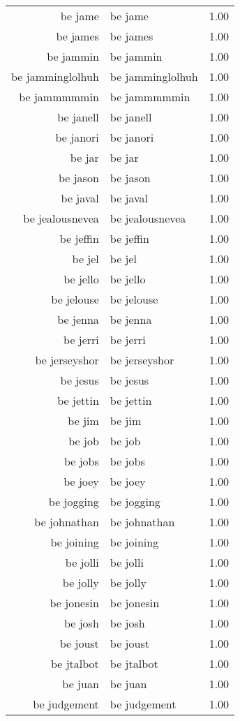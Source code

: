 \begin{table}[ht]
\begin{tabular}{rlr}
  be jame & be jame & 1.00 \\ 
  be james & be james & 1.00 \\ 
  be jammin & be jammin & 1.00 \\ 
  be jamminglolhuh & be jamminglolhuh & 1.00 \\ 
  be jammmmmin & be jammmmmin & 1.00 \\ 
  be janell & be janell & 1.00 \\ 
  be janori & be janori & 1.00 \\ 
  be jar & be jar & 1.00 \\ 
  be jason & be jason & 1.00 \\ 
  be javal & be javal & 1.00 \\ 
  be jealousnevea & be jealousnevea & 1.00 \\ 
  be jeffin & be jeffin & 1.00 \\ 
  be jel & be jel & 1.00 \\ 
  be jello & be jello & 1.00 \\ 
  be jelouse & be jelouse & 1.00 \\ 
  be jenna & be jenna & 1.00 \\ 
  be jerri & be jerri & 1.00 \\ 
  be jerseyshor & be jerseyshor & 1.00 \\ 
  be jesus & be jesus & 1.00 \\ 
  be jettin & be jettin & 1.00 \\ 
  be jim & be jim & 1.00 \\ 
  be job & be job & 1.00 \\ 
  be jobs & be jobs & 1.00 \\ 
  be joey & be joey & 1.00 \\ 
  be jogging & be jogging & 1.00 \\ 
  be johnathan & be johnathan & 1.00 \\ 
  be joining & be joining & 1.00 \\ 
  be jolli & be jolli & 1.00 \\ 
  be jolly & be jolly & 1.00 \\ 
  be jonesin & be jonesin & 1.00 \\ 
  be josh & be josh & 1.00 \\ 
  be joust & be joust & 1.00 \\ 
  be jtalbot & be jtalbot & 1.00 \\ 
  be juan & be juan & 1.00 \\ 
  be judgement & be judgement & 1.00 \\ 

\end{tabular}
\end{table}
